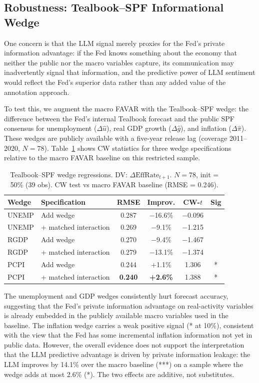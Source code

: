 \subsection{Robustness: Tealbook--SPF Informational Wedge}

One concern is that the LLM signal merely proxies for the Fed's private information advantage: if the Fed knows something about the economy that neither the public nor the macro variables capture, its communication may inadvertently signal that information, and the predictive power of LLM sentiment would reflect the Fed's superior data rather than any added value of the annotation approach.

To test this, we augment the macro FAVAR with the Tealbook--SPF wedge: the difference between the Fed's internal Tealbook forecast and the public SPF consensus for unemployment ($\Delta\hat{u}$), real GDP growth ($\Delta\hat{g}$), and inflation ($\Delta\hat{\pi}$). These wedges are publicly available with a five-year release lag (coverage 2011--2020, $N = 78$). Table~\ref{tab:wedge} shows CW statistics for three wedge specifications relative to the macro FAVAR baseline on this restricted sample.

\begin{table}[ht]
\centering
\caption{Tealbook--SPF wedge regressions. DV: $\Delta\text{EffRate}_{t+1}$. $N = 78$, init = 50\% (39 obs). CW test vs macro FAVAR baseline (RMSE = 0.246).}
\label{tab:wedge}
\small
\begin{tabular}{llcccc}
\toprule
Wedge & Specification & RMSE & Improv. & CW-$t$ & Sig \\
\midrule
UNEMP & Add wedge            & 0.287 & $-$16.6\% & $-$0.096 & \\
UNEMP & + matched interaction & 0.269 & $-$9.1\%  & $-$1.215 & \\
RGDP  & Add wedge            & 0.270 & $-$9.4\%  & $-$1.467 & \\
RGDP  & + matched interaction & 0.279 & $-$13.1\% & $-$1.374 & \\
PCPI  & Add wedge            & 0.244 & +1.1\%    & 1.306    & * \\
PCPI  & + matched interaction & \textbf{0.240} & \textbf{+2.6\%} & 1.388 & * \\
\bottomrule
\end{tabular}
\end{table}

The unemployment and GDP wedges consistently hurt forecast accuracy, suggesting that the Fed's private information advantage on real-activity variables is already embedded in the publicly available macro variables used in the baseline. The inflation wedge carries a weak positive signal (* at 10\%), consistent with the view that the Fed has some incremental inflation information not yet in public data. However, the overall evidence does not support the interpretation that the LLM predictive advantage is driven by private information leakage: the LLM improves by 14.1\% over the macro baseline (***) on a sample where the wedge adds at most 2.6\% (*). The two effects are additive, not substitutes.
